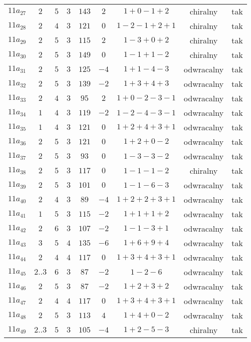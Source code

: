 \begin{longtable}{ccccccccc}
$11a_{27}$ & $2$ & $5$ & $3$ & $143$ & $2$ & $1+0-1+2$ & chiralny & tak \\
$11a_{28}$ & $2$ & $4$ & $3$ & $121$ & $0$ & $1-2-1+2+1$ & chiralny & tak \\
$11a_{29}$ & $2$ & $5$ & $3$ & $115$ & $2$ & $1-3+0+2$ & chiralny & tak \\
$11a_{30}$ & $2$ & $5$ & $3$ & $149$ & $0$ & $1-1+1-2$ & chiralny & tak \\
$11a_{31}$ & $2$ & $5$ & $3$ & $125$ & $-4$ & $1+1-4-3$ & odwracalny & tak \\
$11a_{32}$ & $2$ & $5$ & $3$ & $139$ & $-2$ & $1+3+4+3$ & odwracalny & tak \\
$11a_{33}$ & $2$ & $4$ & $3$ & $95$ & $2$ & $1+0-2-3-1$ & odwracalny & tak \\
$11a_{34}$ & $1$ & $4$ & $3$ & $119$ & $-2$ & $1-2-4-3-1$ & odwracalny & tak \\
$11a_{35}$ & $1$ & $4$ & $3$ & $121$ & $0$ & $1+2+4+3+1$ & odwracalny & tak \\
$11a_{36}$ & $2$ & $5$ & $3$ & $121$ & $0$ & $1+2+0-2$ & odwracalny & tak \\
$11a_{37}$ & $2$ & $5$ & $3$ & $93$ & $0$ & $1-3-3-2$ & odwracalny & tak \\
$11a_{38}$ & $2$ & $5$ & $3$ & $117$ & $0$ & $1-1-1-2$ & chiralny & tak \\
$11a_{39}$ & $2$ & $5$ & $3$ & $101$ & $0$ & $1-1-6-3$ & odwracalny & tak \\
$11a_{40}$ & $2$ & $4$ & $3$ & $89$ & $-4$ & $1+2+2+3+1$ & odwracalny & tak \\
$11a_{41}$ & $1$ & $5$ & $3$ & $115$ & $-2$ & $1+1+1+2$ & odwracalny & tak \\
$11a_{42}$ & $2$ & $6$ & $3$ & $107$ & $-2$ & $1-1-3+1$ & odwracalny & tak \\
$11a_{43}$ & $3$ & $5$ & $4$ & $135$ & $-6$ & $1+6+9+4$ & odwracalny & tak \\
$11a_{44}$ & $2$ & $4$ & $4$ & $117$ & $0$ & $1+3+4+3+1$ & odwracalny & tak \\
$11a_{45}$ & $2..3$ & $6$ & $3$ & $87$ & $-2$ & $1-2-6$ & odwracalny & tak \\
$11a_{46}$ & $2$ & $5$ & $3$ & $87$ & $-2$ & $1+2+3+2$ & odwracalny & tak \\
$11a_{47}$ & $2$ & $4$ & $4$ & $117$ & $0$ & $1+3+4+3+1$ & odwracalny & tak \\
$11a_{48}$ & $2$ & $5$ & $3$ & $113$ & $4$ & $1+4+0-2$ & odwracalny & tak \\
$11a_{49}$ & $2..3$ & $5$ & $3$ & $105$ & $-4$ & $1+2-5-3$ & chiralny & tak \\

\end{longtable}
